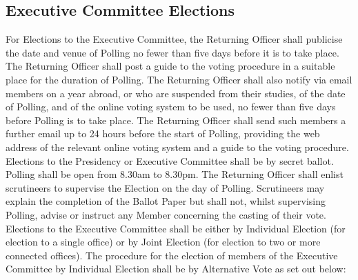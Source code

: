 \subsection{Executive Committee Elections}
\npara For Elections to the Executive Committee, the Returning Officer shall publicise the date and venue of Polling no fewer than five days before it is to take place. The Returning Officer shall post a guide to the voting procedure in a suitable place for the duration of Polling. The Returning Officer shall also notify via email members on a year abroad, or who are suspended from their studies, of the date of Polling, and of the online voting system to be used, no fewer than five days before Polling is to take place. The Returning Officer shall send such members a further email up to 24 hours before the start of Polling, providing the web address of the relevant online voting system and a guide to the voting procedure.
\npara Elections to the Presidency or Executive Committee shall be by secret ballot. Polling shall be open from 8.30am to 8.30pm.
\npara The Returning Officer shall enlist scrutineers to supervise the Election on the day of Polling. Scrutineers may explain the completion of the Ballot Paper but shall not, whilst supervising Polling, advise or instruct any Member concerning the casting of their vote.
\npara Elections to the Executive Committee shall be either by Individual Election (for election to a single office) or by Joint Election (for election to two or more connected offices).
\npara The procedure for the election of members of the Executive Committee by Individual Election shall be by Alternative Vote as set out below:
